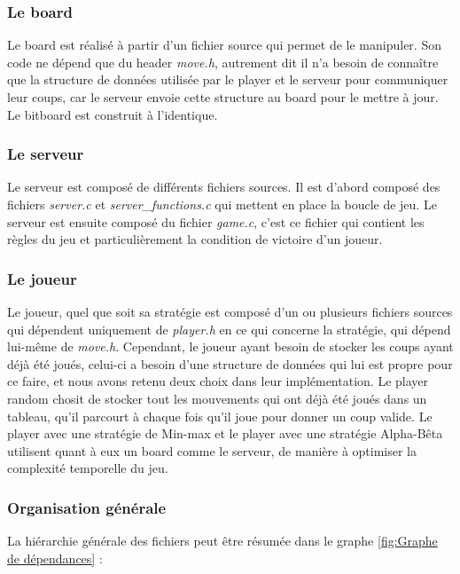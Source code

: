 \documentclass[12pt]{article}
\begin{document}
\subsubsection{Le board}

Le board est réalisé à partir d'un fichier source qui permet de le manipuler. Son code ne dépend que du header \emph{move.h}, autrement dit il n'a besoin de connaître que la structure de données utilisée par le player et le serveur pour communiquer leur coups, car le serveur envoie cette structure au board pour le mettre à jour.
Le bitboard est construit à l'identique.

\subsubsection{Le serveur}

Le serveur est composé de différents fichiers sources. Il est d'abord composé des fichiers \emph{server.c} et \emph{server\_functions.c} qui mettent en place la boucle de jeu. Le serveur est ensuite composé du fichier \emph{game.c}, c'est ce fichier qui contient les règles du jeu et particulièrement la condition de victoire d'un joueur.

\subsubsection{Le joueur}

Le joueur, quel que soit sa stratégie est composé d'un ou plusieurs fichiers sources qui dépendent uniquement de \emph{player.h} en ce qui concerne la stratégie, qui dépend lui-même de \emph{move.h}.
Cependant, le joueur ayant besoin de stocker les coups ayant déjà été joués, celui-ci a besoin d'une structure de données qui lui est propre pour ce faire, et nous avons retenu deux choix dans leur implémentation.
Le player random chosit de stocker tout les mouvements qui ont déjà été joués dans un tableau, qu'il parcourt à chaque fois qu'il joue pour donner un coup valide.
Le player avec une stratégie de Min-max et le player avec une stratégie Alpha-Bêta utilisent quant à eux un board comme le serveur, de manière à optimiser la complexité temporelle du jeu.

\subsubsection{Organisation générale}

La hiérarchie générale des fichiers peut être résumée dans le graphe \ref{fig:Graphe de dépendances} :
\end{document}
